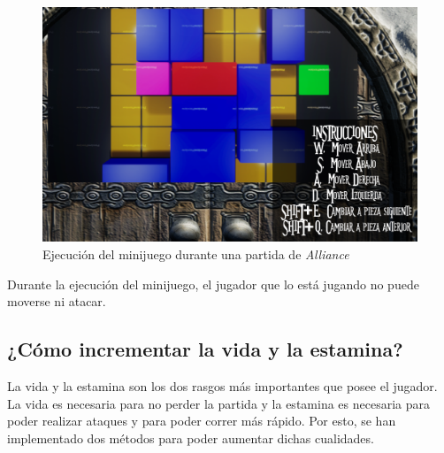 \begin{figure}[H]
  \centering
  \includegraphics[width=12cm]{./images/Minijuego.png}
  \caption{Ejecución del minijuego durante una partida de \textit{Alliance}}
  \label{Minijuego}
\end{figure}

Durante la ejecución del minijuego, el jugador que lo está jugando no puede moverse ni atacar.


\subsection{¿Cómo incrementar la vida y la estamina?}

La vida y la estamina son los dos rasgos más importantes que posee el jugador. La vida es necesaria para no perder la partida y la estamina es necesaria para poder realizar ataques y para poder correr más rápido. Por esto, se han implementado dos métodos para poder aumentar dichas cualidades.

